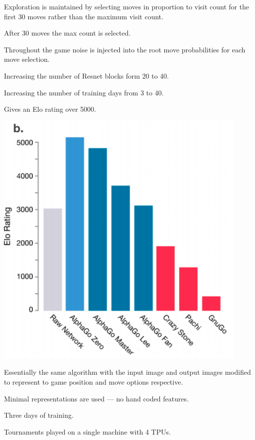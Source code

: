 {

Exploration is maintained by selecting moves in proportion to visit count for the first 30 moves rather than
the maximum visit count.

\vfill
After 30 moves the max count is selected.

\vfill
Throughout the game noise is injected into the root move probabilities
for each move selection.


Increasing the number of Resnet blocks form 20 to 40.

\vfill
Increasing the number of training days from 3 to 40.

\vfill
Gives an Elo rating over 5000.


\centerline{\includegraphics[height = 5in]{../images/alpha40}}


Essentially the same algorithm with the input image and output images modified to represent to game position and move options respective.

\vfill
Minimal representations are used --- no hand coded features.

\vfill
Three days of training.

\vfill
Tournaments played on a single machine with 4 TPUs.

}
